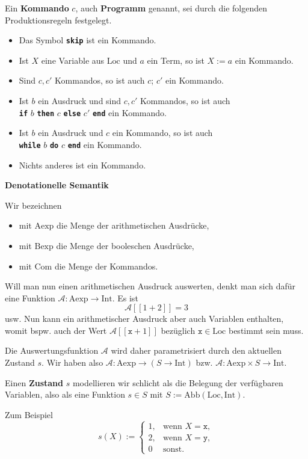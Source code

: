\documentclass[8pt,fleqn,aspectratio=169]{beamer}
\newcommand{\strong}[1]{\textsf{\textbf{#1}}}
\newcommand{\centerheadline}[1]{%
  \begin{center}\strong{#1}\end{center}}
\newcommand{\parspace}{\vspace{0.8em}}
\newcommand{\kw}[1]{\textbf{\texttt{#1}}}
\newcommand{\code}[1]{{\texttt{#1}}}
\newcommand{\qb}[1]{[\!\![#1]\!\!]}
\newcommand{\Int}{\mathrm{Int}}
\newcommand{\Loc}{\mathrm{Loc}}
\newcommand{\Aexp}{\mathrm{Aexp}}
\newcommand{\Bexp}{\mathrm{Bexp}}
\newcommand{\Com}{\mathrm{Com}}
\newcommand{\evA}{\mathcal A}
\newcommand{\Abb}{\mathrm{Abb}}
\begin{document}
\begin{frame}
Ein \strong{Kommando} $c$, auch \strong{Programm} genannt, sei durch die
folgenden Produktionsregeln festgelegt.
\begin{itemize}
\item Das Symbol \kw{skip} ist ein Kommando.
\item Ist $X$ eine Variable aus $\mathrm{Loc}$ und $a$ ein Term, so ist $X:=a$ ein Kommando.
\item Sind $c,c'$ Kommandos, so ist auch $c$; $c'$ ein Kommando.
\item Ist $b$ ein Ausdruck und sind $c,c'$ Kommandos, so ist auch\\
  \kw{if} $b$ \kw{then} $c$ \kw{else} $c'$ \kw{end} ein Kommando.
\item Ist $b$ ein Ausdruck und $c$ ein Kommando, so ist auch\\
  \kw{while} $b$ \kw{do} $c$ \kw{end} ein Kommando.
\item Nichts anderes ist ein Kommando.
\end{itemize}
\end{frame}

\begin{frame}
\centerheadline{Denotationelle Semantik}
\end{frame}

\begin{frame}
Wir bezeichnen
\begin{itemize}
\item mit $\Aexp$ die Menge der arithmetischen Ausdrücke,
\item mit $\Bexp$ die Menge der booleschen Ausdrücke,
\item mit $\Com$ die Menge der Kommandos.
\end{itemize}\pause
Will man nun einen arithmetischen Ausdruck auswerten, denkt
man sich dafür eine Funktion $\evA\colon\Aexp\to\Int$. Es ist
\[\evA\qb{1+2} = 3\]
usw. Nun kann ein arithmetischer Ausdruck aber auch Variablen enthalten,
womit bspw. auch der Wert $\evA\qb{\code{x}+1}$ bezüglich $\code{x}\in\Loc$
bestimmt sein muss.
\end{frame}

\begin{frame}
Die Auswertungsfunktion $\evA$ wird daher parametrisiert durch den aktuellen
Zustand $s$. Wir haben also $\evA\colon\Aexp\to (S\to\Int)$
bzw. $\evA\colon\Aexp\times S\to\Int$.\pause

\parspace
Einen \strong{Zustand} $s$ modellieren wir schlicht als die Belegung
der verfügbaren Variablen, also als eine Funktion $s\in S$ mit
$S:=\Abb(\Loc,\Int)$.\pause

\parspace
Zum Beispiel
\[s(X) := \begin{cases}
1, & \text{wenn $X=\code{x}$},\\
2, & \text{wenn $X=\code{y}$},\\
0 & \text{sonst}. 
\end{cases}\]
\end{frame}
\end{document}
